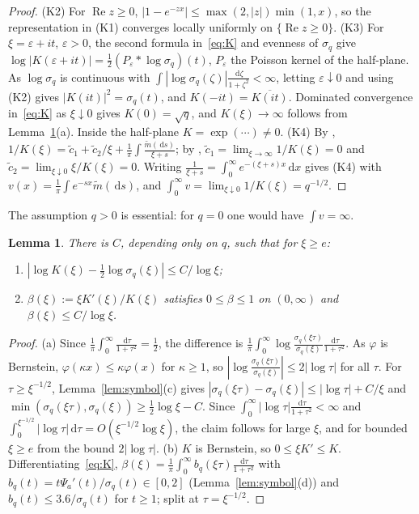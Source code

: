 \documentclass[11pt]{amsart}
\newcommand{\dd}{\,\mathrm{d}}
\newcommand{\eps}{\varepsilon}
\DeclareMathOperator{\re}{Re}
\newtheorem{lemma}[theorem]{Lemma}
\theoremstyle{definition}
\theoremstyle{remark}
\numberwithin{equation}{section}
\begin{document}
\begin{proof}
(K2) For $\re z\ge0$, $|1-e^{-zx}|\le\max(2,|z|)\min(1,x)$, so the representation in (K1) converges locally uniformly on $\{\re z\ge0\}$. (K3) For $\xi=\eps+it$, $\eps>0$, the second formula in~\eqref{eq:K} and evenness of $\sigma_q$ give $\log|K(\eps+it)|=\frac12(P_\eps*\log\sigma_q)(t)$, $P_\eps$ the Poisson kernel of the half-plane. As $\log\sigma_q$ is continuous with $\int|\log\sigma_q(\zeta)|\frac{\dd\zeta}{1+\zeta^2}<\infty$, letting $\eps\downarrow0$ and using (K2) gives $|K(it)|^2=\sigma_q(t)$, and $K(-it)=\overline{K(it)}$. Dominated convergence in~\eqref{eq:K} as $\xi\downarrow0$ gives $K(0)=\sqrt q$, and $K(\xi)\to\infty$ follows from Lemma~\ref{lem:Kasym}(a). Inside the half-plane $K=\exp(\cdots)\ne0$. (K4) By \cite[Prop.~2.17(a)]{Kw11}, $1/K(\xi)=\tilde c_1+\tilde c_2/\xi+\frac1\pi\int\frac{\tilde m(\dd s)}{\xi+s}$; by \cite[Prop.~2.18]{Kw11}, $\tilde c_1=\lim_{\xi\to\infty}1/K(\xi)=0$ and $\tilde c_2=\lim_{\xi\downarrow0}\xi/K(\xi)=0$. Writing $\frac1{\xi+s}=\int_0^\infty e^{-(\xi+s)x}\dd x$ gives (K4) with $v(x)=\frac1\pi\int e^{-sx}\tilde m(\dd s)$, and $\int_0^\infty v=\lim_{\xi\downarrow0}1/K(\xi)=q^{-1/2}$.
\end{proof}

The assumption $q>0$ is essential: for $q=0$ one would have $\int v=\infty$.

\begin{lemma}\label{lem:Kasym}
There is $C$, depending only on $q$, such that for $\xi\ge e$:
\begin{enumerate}
\item[(a)] $|\log K(\xi)-\frac12\log\sigma_q(\xi)|\le C/\log\xi$;
\item[(b)] $\beta(\xi):=\xi K'(\xi)/K(\xi)$ satisfies $0\le\beta\le1$ on $(0,\infty)$ and $\beta(\xi)\le C/\log\xi$.
\end{enumerate}
\end{lemma}

\begin{proof}
(a) Since $\frac1\pi\int_0^\infty\frac{\dd\tau}{1+\tau^2}=\frac12$, the difference is $\frac1\pi\int_0^\infty\log\frac{\sigma_q(\xi\tau)}{\sigma_q(\xi)}\frac{\dd\tau}{1+\tau^2}$. As $\varphi$ is Bernstein, $\varphi(\kappa x)\le\kappa\varphi(x)$ for $\kappa\ge1$, so $|\log\frac{\sigma_q(\xi\tau)}{\sigma_q(\xi)}|\le2|\log\tau|$ for all $\tau$. For $\tau\ge\xi^{-1/2}$, Lemma~\ref{lem:symbol}(c) gives $|\sigma_q(\xi\tau)-\sigma_q(\xi)|\le|\log\tau|+C/\xi$ and $\min(\sigma_q(\xi\tau),\sigma_q(\xi))\ge\frac12\log\xi-C$. Since $\int_0^\infty|\log\tau|\frac{\dd\tau}{1+\tau^2}<\infty$ and $\int_0^{\xi^{-1/2}}|\log\tau|\dd\tau=O(\xi^{-1/2}\log\xi)$, the claim follows for large $\xi$, and for bounded $\xi\ge e$ from the bound $2|\log\tau|$. (b) $K$ is Bernstein, so $0\le\xi K'\le K$. Differentiating~\eqref{eq:K}, $\beta(\xi)=\frac1\pi\int_0^\infty b_q(\xi\tau)\frac{\dd\tau}{1+\tau^2}$ with $b_q(t)=t\Psi_a'(t)/\sigma_q(t)\in[0,2]$ (Lemma~\ref{lem:symbol}(d)) and $b_q(t)\le3.6/\sigma_q(t)$ for $t\ge1$; split at $\tau=\xi^{-1/2}$.
\end{proof}
\end{document}
